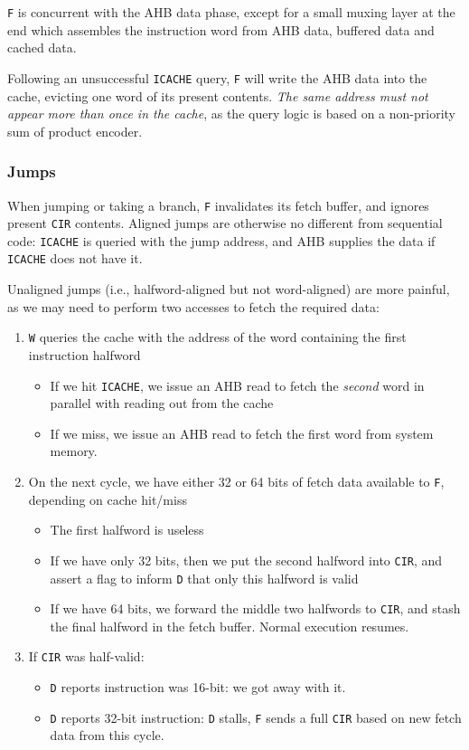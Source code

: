\documentclass{article}
\begin{document}
\texttt{F} is concurrent with the AHB data phase, except for a small muxing layer at the end which assembles the instruction word from AHB data, buffered data and cached data.

Following an unsuccessful \texttt{ICACHE} query, \texttt{F} will write the AHB data into the cache, evicting one word of its present contents. \textit{The same address must not appear more than once in the cache}, as the query logic is based on a non-priority sum of product encoder.


\subsubsection{Jumps}
\label{section:jumps}

When jumping or taking a branch, \texttt{F} invalidates its fetch buffer, and ignores present \texttt{CIR} contents. Aligned jumps are otherwise no different from sequential code: \texttt{ICACHE} is queried with the jump address, and AHB supplies the data if \texttt{ICACHE} does not have it.

Unaligned jumps (i.e., halfword-aligned but not word-aligned) are more painful, as we may need to perform two accesses to fetch the required data:

\begin{enumerate}
	\item \texttt{W} queries the cache with the address of the word containing the first instruction halfword
	\begin{itemize}
		\item If we hit \texttt{ICACHE}, we issue an AHB read to fetch the \textit{second} word in parallel with reading out from the cache
		\item If we miss, we issue an AHB read to fetch the first word from system memory.
	\end{itemize}
	\item On the next cycle, we have either 32 or 64 bits of fetch data available to \texttt{F}, depending on cache hit/miss
	\begin{itemize}
		\item The first halfword is useless
		\item If we have only 32 bits, then we put the second halfword into \texttt{CIR}, and assert a flag to inform \texttt{D} that only this halfword is valid
		\item If we have 64 bits, we forward the middle two halfwords to \texttt{CIR}, and stash the final halfword in the fetch buffer. Normal execution resumes.
	\end{itemize}
	\item If \texttt{CIR} was half-valid:
		\begin{itemize}
			\item \texttt{D} reports instruction was 16-bit: we got away with it.
			\item \texttt{D} reports 32-bit instruction: \texttt{D} stalls, \texttt{F} sends a full \texttt{CIR} based on new fetch data from this cycle.
		\end{itemize}
\end{enumerate}
\end{document}
